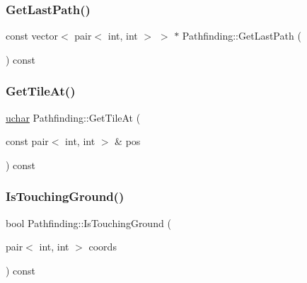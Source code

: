 \mbox{\label{class_pathfinding_aabee4bd29cea753c592a5fe9d595608a}} 
\subsubsection{\texorpdfstring{GetLastPath()}{GetLastPath()}}
{\footnotesize\ttfamily const vector$<$ pair$<$ int, int $>$ $>$ $\ast$ Pathfinding\+::\+Get\+Last\+Path (\begin{DoxyParamCaption}{ }\end{DoxyParamCaption}) const}

\mbox{\label{class_pathfinding_a531ff73d3dcc30449d706ab441552654}} 
\subsubsection{\texorpdfstring{GetTileAt()}{GetTileAt()}}
{\footnotesize\ttfamily \mbox{\hyperlink{_defs_8h_a65f85814a8290f9797005d3b28e7e5fc}{uchar}} Pathfinding\+::\+Get\+Tile\+At (\begin{DoxyParamCaption}\item[{const pair$<$ int, int $>$ \&}]{pos }\end{DoxyParamCaption}) const}

\mbox{\label{class_pathfinding_a26965e2ab0d36f45e82642e14a853b2d}} 
\subsubsection{\texorpdfstring{IsTouchingGround()}{IsTouchingGround()}}
{\footnotesize\ttfamily bool Pathfinding\+::\+Is\+Touching\+Ground (\begin{DoxyParamCaption}\item[{pair$<$ int, int $>$}]{coords }\end{DoxyParamCaption}) const}

\mbox{\label{class_pathfinding_adb3abbc864c78d5f3acbf7dda6c9cf7b}} 
